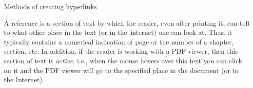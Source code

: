 {{%
%



\sec[links] Methods of creating hyperlinks

A reference is a section of text by which the reader, even after printing it, can tell to what other place in the text (or in the~internet) one can look at. Thus, it typically contains a numerical indication of page or the number of a chapter, section, etc. In addition, if the reader is working with a PDF viewer, then this section of text is {\em active}, i.e., when the mouse hovers over
this text you can click on it and the PDF viewer will go to the specified place in the document (or to the Internet).

}}
